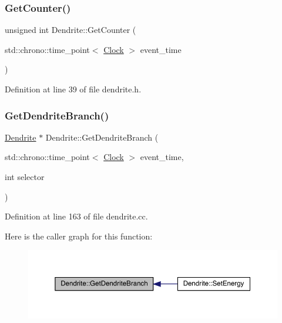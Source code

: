 \subsubsection{\texorpdfstring{Get\+Counter()}{GetCounter()}}
{\footnotesize\ttfamily unsigned int Dendrite\+::\+Get\+Counter (\begin{DoxyParamCaption}\item[{std\+::chrono\+::time\+\_\+point$<$ \hyperlink{universe_8h_a0ef8d951d1ca5ab3cfaf7ab4c7a6fd80}{Clock} $>$}]{event\+\_\+time }\end{DoxyParamCaption})\hspace{0.3cm}{\ttfamily [inline]}}



Definition at line 39 of file dendrite.\+h.

\mbox{\label{class_dendrite_a1465037ca014fa8bbefc8c0ad70d1647}} 
\subsubsection{\texorpdfstring{Get\+Dendrite\+Branch()}{GetDendriteBranch()}}
{\footnotesize\ttfamily \hyperlink{class_dendrite}{Dendrite} $\ast$ Dendrite\+::\+Get\+Dendrite\+Branch (\begin{DoxyParamCaption}\item[{std\+::chrono\+::time\+\_\+point$<$ \hyperlink{universe_8h_a0ef8d951d1ca5ab3cfaf7ab4c7a6fd80}{Clock} $>$}]{event\+\_\+time,  }\item[{int}]{selector }\end{DoxyParamCaption})}



Definition at line 163 of file dendrite.\+cc.

Here is the caller graph for this function\+:
\nopagebreak
\begin{figure}[H]
\begin{center}
\leavevmode
\includegraphics[width=350pt]{class_dendrite_a1465037ca014fa8bbefc8c0ad70d1647_icgraph}
\end{center}
\end{figure}
\mbox{\label{class_dendrite_a00b524d47e3662df712ea060ebadca77}} 
